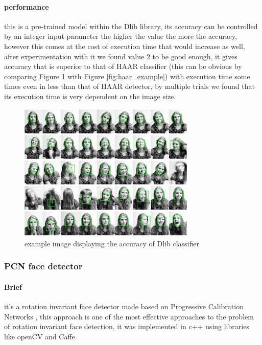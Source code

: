 \paragraph{performance}
this is a pre-trained model within the Dlib library, its accuracy can be controlled by an integer input parameter the higher the value the more the accuracy, however this comes at the cost of execution time that would increase as well, after experimentation with it we found value 2 to be good enough, it gives accuracy that is superior to that of HAAR classifier (this can be obvious by comparing Figure \ref{fig:dlib_example} with Figure \ref{fig:haar_example}) with execution time some times even in less than that of HAAR detector, by multiple trials we found that its execution time is very dependent on the image size.


\begin{figure}
	\centering
	\includegraphics[width=0.75\textwidth]{images/dlib_example.jpg}
	\caption{example image displaying the accuracy of Dlib classifier}
	\label{fig:dlib_example}
\end{figure}

\subsubsection{PCN face detector}
\paragraph{Brief}
it's a rotation invariant face detector made based on Progressive Calibration Networks \cite{PCN}, this approach is one of the most effective approaches to the problem of rotation invariant face detection, it was implemented in c++ using libraries like openCV and Caffe.
